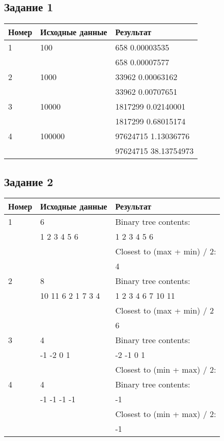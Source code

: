 \subsection*{\centering Задание 1}
\begin{table}[H]
    \centering
    \begin{tabular}{|l|l|l|}
        \hline
        Номер & Исходные данные & Результат\\[2ex] \hline
        1     & 100             & 658 0.00003535\\
              &                 & 658 0.00007577\\[2ex] \hline
        2     & 1000            & 33962 0.00063162\\
              &                 & 33962 0.00707651\\[2ex] \hline
        3     & 10000           & 1817299 0.02140001\\
              &                 & 1817299 0.68015174\\[2ex] \hline
        4     & 100000          & 97624715 1.13036776\\
              &                 & 97624715 38.13754973\\[2ex] \hline
    \end{tabular}
\end{table}
\pagebreak
\subsection*{\centering Задание 2}
\begin{table}[H]
    \centering
    \begin{tabular}{|l|l|l|}
        \hline
        Номер & Исходные данные & Результат\\[2ex] \hline
        1     & 6               & Binary tree contents:\\
              & 1 2 3 4 5 6     & 1 2 3 4 5 6\\
              &                 & Closest to (max + min) / 2:\\
              &                 & 4\\[2ex] \hline
        2     & 8                 & Binary tree contents:\\
              & 10 11 6 2 1 7 3 4 & 1 2 3 4 6 7 10 11\\
              &                   & Closest to (max + min) / 2\\
              &                   & 6\\[2ex] \hline
        3     & 4                 & Binary tree contents:\\
              & -1 -2 0 1         & -2 -1 0 1\\
              &                   & Closest to (min + max) / 2:\\[2ex] \hline
        4     & 4                 & Binary tree contents:\\
              & -1 -1 -1 -1       & -1\\
              &                   & Closest to (min + max) / 2:\\
              &                   & -1\\[2ex] \hline
    \end{tabular}
\end{table}
